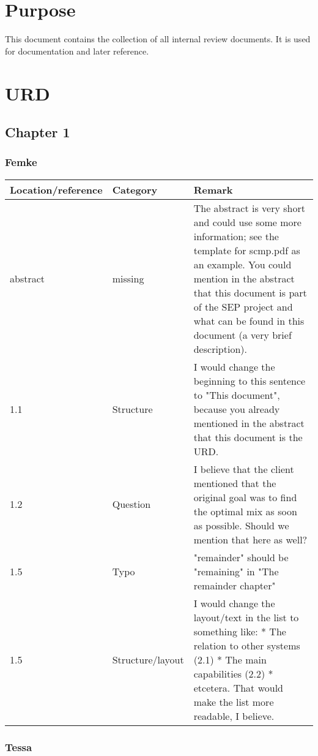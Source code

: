 




\chapter{Purpose}
This document contains the collection of all internal review documents. It is used for documentation and later reference.

\chapter{URD}
\section{Chapter 1}

\subsection*{Femke}

\begin{tabular}{l|l|p{}}
Location/reference & Category & Remark\\
\hline
\hline
abstract & missing & The abstract is very short and could use some more information; see the template for scmp.pdf as an example. You could mention in the abstract that this document is part of the SEP project and what can be found in this document (a very brief description). \vspace{1em} \\
1.1 & Structure & I would change the beginning to this sentence to "This document", because you already mentioned in the abstract that this document is the URD.\vspace{1em} \\
1.2 & Question & I believe that the client mentioned that the original goal was to find the optimal mix as soon as possible. Should we mention that here as well? \vspace{1em} \\
1.5 & Typo & "remainder" should be "remaining" in "The remainder chapter"\\ 
1.5 & Structure/layout & I would change the layout/text in the list to something like:
* The relation to other systems (2.1)
* The main capabilities (2.2)
* etcetera.
That would make the list more readable, I believe.\\
\end{tabular}

\subsection*{Tessa}

